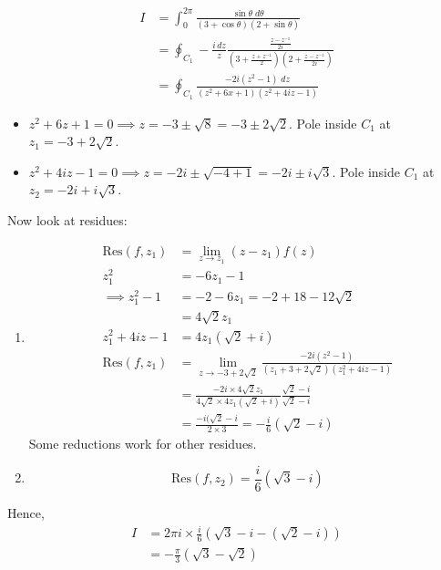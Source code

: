 \documentclass[a4paper, 11pt, normalem]{report}
\begin{document}
\begin{example}
    \begin{align}
        I &= \int_0^{2\pi} \frac{\sin\theta\;d\theta}{(3+\cos\theta)(2+\sin\theta)} \\
          &= \oint_{C_1} -\frac{i\,dz}{z} \frac{\frac{z-z^{-1}}{2i}}{\left(3 + \frac{z+z^{-1}}{2}\right)\left(2 + \frac{z-z^{-1}}{2i}\right)} \\
          &= \oint_{C_1} \frac{-2i (z^2 - 1)\;dz}{(z^2 + 6x + 1)(z^2 + 4iz - 1)}
    \end{align}
    \begin{itemize}
        \item $z^2 + 6z + 1 = 0 \implies z = -3 \pm \sqrt{8} = -3 \pm 2\sqrt{2}$.
            Pole inside $C_1$ at $z_1 = -3 + 2\sqrt{2}$.
        \item $z^2 + 4iz - 1 = 0 \implies z = -2i \pm \sqrt{-4 + 1} = -2i \pm i\sqrt{3}$.
            Pole inside $C_1$ at $z_2 = -2i + i\sqrt{3}$.
    \end{itemize}
    Now look at residues:
    \begin{enumerate}
        \item
            \begin{align}
                \text{Res}(f,z_1) &= \lim_{z\to z_1} (z-z_1)f(z) \\
                z_1^2 &= -6z_1 - 1 \\
                \implies z_1^2 - 1 &= -2 - 6z_1 = -2 + 18 -12\sqrt{2} \\
                                   &= 4\sqrt{2}z_1 \\
                z_1^2 + 4iz - 1 &= 4z_1(\sqrt{2} + i) \\
                \text{Res}(f,z_1) &= \lim_{z\to -3+2\sqrt{2}} \frac{-2i(z^2 - 1)}{(z_1 + 3 + 2\sqrt{2})(z_1^2 + 4iz -1)} \\
                                  &= \frac{-2i \times 4\sqrt{2}z_1}{4\sqrt{2} \times 4z_1 (\sqrt{2}+i)} \frac{\sqrt{2} - i}{\sqrt{2} - i} \\
                                  &= \frac{-i(\sqrt{2} - i}{2\times 3} = -\frac{i}{6}(\sqrt{2} -i)
            \end{align}
            Some reductions work for other residues.
        \item
            \begin{equation}
                \text{Res}(f,z_2) = \frac{i}{6}(\sqrt{3} - i)
            \end{equation}
    \end{enumerate}
    Hence,
    \begin{align}
        I &= 2\pi i \times \frac{i}{6}(\sqrt{3} - i - (\sqrt{2} - i)) \\
          &= -\frac{\pi}{3} (\sqrt{3} - \sqrt{2})
    \end{align}
\end{example}
\end{document}
